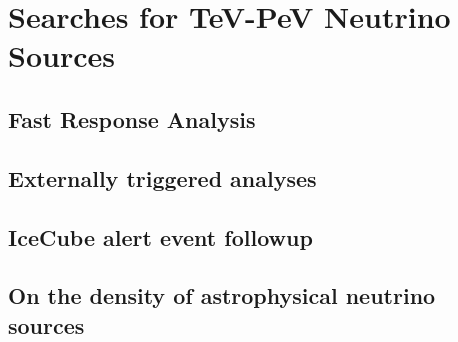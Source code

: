 \chapter{Searches for TeV-PeV Neutrino Sources}
\label{sec:tev_to_pev}

\section{Fast Response Analysis}

\section{Externally triggered analyses}

\section{IceCube alert event followup}

\section{On the density of astrophysical neutrino sources}